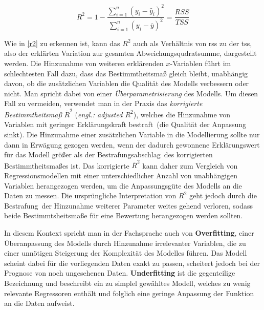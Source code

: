\begin{equation}
R^2 = 1 - \frac{\sum\limits_{i=1}^n (y_i - \hat{y}_i)^2}{\sum\limits_{i=1}^n (y_i - \overline{y})^2}= \frac{RSS}{TSS}
\label{r2}
\end{equation}

Wie in \vref{r2} zu erkennen ist, kann das $R^2$ auch als Verhältnis von \gls{rss} zu der \gls{tss}, also der erklärten Variation zur gesamten Abweichungsqudratsumme, dargestellt werden. Die Hinzunahme von weiteren erklärenden $x$-Variablen führt im schlechtesten Fall dazu, dass das Bestimmtheitsmaß gleich bleibt, unabhängig davon, ob die zusätzlichen Variablen die Qualität des Modells verbessern oder nicht. Man spricht dabei von einer \textit{Überparametrisierung} des Modells. Um diesen Fall zu vermeiden, verwendet man in der Praxis das \textit{korrigierte Bestimmtheitsmaß} $\overline{R}^2$ (\textit{engl.: adjusted $R^2$}), welches die Hinzunahme von Variablen mit geringer Erklärungskraft \glqq bestraft\grqq~(die Qualität der Anpassung sinkt). Die Hinzunahme einer zusätzlichen Variable in die Modellierung sollte nur dann in Erwägung gezogen werden, wenn der dadurch gewonnene Erklärungswert für das Modell größer als der \glqq Bestrafungsabschlag\grqq~des korrigierten Bestimmtheitsmaßes ist. Das korrigierte $\overline{R}^2$ kann daher zum Vergleich von Regressionsmodellen mit einer unterschiedlicher Anzahl von unabhängigen Variablen herangezogen werden, um die Anpassungsgüte des Modells an die Daten zu messen. Die ursprüngliche Interpretation von $R^2$ geht jedoch durch die \glqq Bestrafung\grqq~der Hinzunahme weiterer Parameter weites gehend verloren, sodass beide Bestimmtsheitsmaße für eine Bewertung herangezogen werden sollten. 

In diesem Kontext spricht man in der Fachsprache auch von \textbf{Overfitting}, einer Überanpassung des Modells durch Hinzunahme irrelevanter Variablen, die zu einer unnötigen Steigerung der Komplexität des Modelles führen. Das Modell scheint dabei für die vorliegenden Daten exakt zu passen, scheitert jedoch bei der Prognose von noch ungesehenen Daten. \textbf{Underfitting} ist die gegenteilige Bezeichnung und beschreibt ein zu simplel gewähltes Modell, welches zu wenig relevante Regressoren enthält und folglich eine geringe Anpassung der Funktion an die Daten aufweist. 


